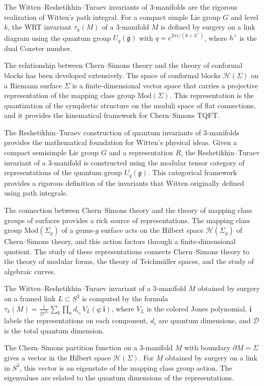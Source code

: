 The Witten--Reshetikhin--Turaev invariants of 3-manifolds are the rigorous realization of Witten's path integral. For a compact simple Lie group $G$ and level $k$, the WRT invariant $\tau_k(M)$ of a 3-manifold $M$ is defined by surgery on a link diagram using the quantum group $U_q(\mathfrak{g})$ with $q = e^{2\pi i/(k+h^\vee)}$, where $h^\vee$ is the dual Coxeter number.

The relationship between Chern--Simons theory and the theory of conformal blocks has been developed extensively. The space of conformal blocks $\mathcal{H}(\Sigma)$ on a Riemann surface $\Sigma$ is a finite-dimensional vector space that carries a projective representation of the mapping class group $\text{Mod}(\Sigma)$. This representation is the quantization of the symplectic structure on the moduli space of flat connections, and it provides the kinematical framework for Chern--Simons TQFT.

The Reshetikhin--Turaev construction of quantum invariants of 3-manifolds provides the mathematical foundation for Witten's physical ideas. Given a compact semisimple Lie group $G$ and a representation $R$, the Reshetikhin--Turaev invariant of a 3-manifold is constructed using the modular tensor category of representations of the quantum group $U_q(\mathfrak{g})$. This categorical framework provides a rigorous definition of the invariants that Witten originally defined using path integrals.

The connection between Chern--Simons theory and the theory of mapping class groups of surfaces provides a rich source of representations. The mapping class group $\text{Mod}(\Sigma_g)$ of a genus-$g$ surface acts on the Hilbert space $\mathcal{H}(\Sigma_g)$ of Chern--Simons theory, and this action factors through a finite-dimensional quotient. The study of these representations connects Chern--Simons theory to the theory of modular forms, the theory of Teichm\"uller spaces, and the study of algebraic curves.

The Witten--Reshetikhin--Turaev invariant of a 3-manifold $M$ obtained by surgery on a framed link $L \subset S^3$ is computed by the formula $\tau_k(M) = \frac{1}{\mathcal{D}^{|L|}} \sum_{\mathbf{i}} \prod_{a} d_{i_a} \, V_L(q; \mathbf{i})$, where $V_L$ is the colored Jones polynomial, $\mathbf{i}$ labels the representations on each component, $d_i$ are quantum dimensions, and $\mathcal{D}$ is the total quantum dimension.

The Chern--Simons partition function on a 3-manifold $M$ with boundary $\partial M = \Sigma$ gives a vector in the Hilbert space $\mathcal{H}(\Sigma)$. For $M$ obtained by surgery on a link in $S^3$, this vector is an eigenstate of the mapping class group action. The eigenvalues are related to the quantum dimensions of the representations.

